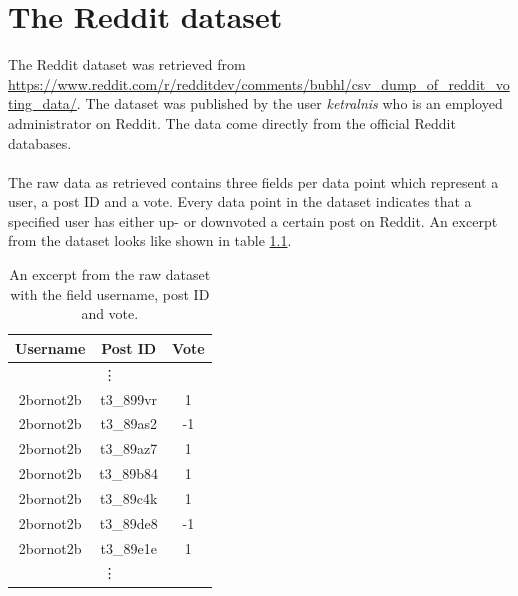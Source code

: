 \chapter{The Reddit dataset}\label{appendix:reddit}
The Reddit dataset was retrieved from \url{https://www.reddit.com/r/redditdev/comments/bubhl/csv_dump_of_reddit_voting_data/}. The dataset was published by the user \textit{ketralnis} who is an employed administrator on Reddit. The data come directly from the official Reddit databases.
\\\\
The raw data as retrieved contains three fields per data point which represent a user, a post ID and a vote. Every data point in the dataset indicates that a specified user has either up- or downvoted a certain post on Reddit. An excerpt from the dataset looks like shown in table \ref{table:reddit_raw_excerpt}.
\begin{table}[h!]
    \centering
    \begin{tabular}{ c c c } 
        \hline
        \textbf{Username} & \textbf{Post ID} & \textbf{Vote} \\
        \hline
        \multicolumn{3}{c}{\vdots} \\
        2bornot2b & t3\_899vr & 1 \\
        2bornot2b & t3\_89as2 & -1 \\
        2bornot2b & t3\_89az7 & 1 \\
        2bornot2b & t3\_89b84 & 1 \\
        2bornot2b & t3\_89c4k & 1 \\
        2bornot2b & t3\_89de8 & -1 \\
        2bornot2b & t3\_89e1e & 1 \\
        \multicolumn{3}{c}{\vdots} \\
    \end{tabular}
    \caption{An excerpt from the raw dataset with the field username, post ID and vote.}
    \label{table:reddit_raw_excerpt}
\end{table}
